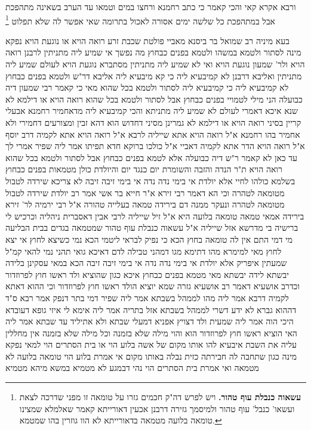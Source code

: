 \documentclass[12pt, openany]{book}
\newcommand{\footnotecomment}[1]{\footnote{#1}}
\newcommand{\commenta}[1]{\footnotecomment{#1}}
\begin{document}
{ורבא אקרא קאי והכי קאמר  כי כתב רחמנא ורחצו במים וטמאו עד הערב בשאינה מתהפכת אבל במתהפכת כל שלשה ימים אסורה לאכול בתרומה שאי אפשר לה שלא תפלוט 
\commenta{\textbf{עשאוה כנבלת עוף טהור.}  ויש לפרש דה"ק חכמים גזרו על טומאה זו מפני שדרכה לצאת ועשאו' כנבל' עוף טהור ולמיסמך גזירה דרבנן אכעין דאורייתא קאמר שאלמלא שמצינו טומאה בלועה מטמאה בדאורייתא לא הוו גוזרין בהו שמטמא. }

בעא מיניה רב שמואל בר ביסנא מאביי  פולטת שכבת זרע רואה הויא או נוגעת הויא 
נפקא מינה  לסתור ולטמא במשהו ולטמא בפנים כבחוץ 
מה נפשך אי שמיע ליה מתניתין לרבנן רואה הויא ולר' שמעון נוגעת הויא 
ואי לא שמיע ליה מתניתין מסתברא נוגעת הויא 
לעולם שמיע ליה מתניתין ואליבא דרבנן לא קמיבעיא ליה כי קא מיבעיא ליה אליבא דר"ש 
ולטמא בפנים כבחוץ לא קמיבעיא ליה כי קמיבעיא ליה לסתור ולטמא בכל שהוא מאי 
כי קאמר רבי שמעון דיה כבועלה הני מילי לטמויי בפנים כבחוץ אבל לסתור ולטמא בכל שהוא רואה הויא או דילמא לא שנא 
איכא דאמרי  לעולם לא שמיע ליה מתניתא והכי קמיבעיא ליה מדאחמיר רחמנא אבעלי קריין בסיני רואה הויא 
או דילמא  לא גמרינן מסיני דחדוש הוא דהא זבין ומצורעים דחמירי ולא אחמיר בהו רחמנא 
א"ל  רואה הויא  אתא שייליה לרבא א"ל  רואה הויא  אתא לקמיה דרב יוסף א"ל  רואה הויא  הדר אתא לקמיה דאביי א"ל  כולכו ברוקא חדא תפיתו 
אמר ליה  שפיר אמרי לך עד כאן לא קאמר ר"ש דיה כבועלה אלא לטמא בפנים כבחוץ אבל לסתור ולטמא בכל שהוא רואה הויא
ת"ר  הנדה והזבה והשומרת יום כנגד יום והיולדת כולן מטמאות בפנים כבחוץ 
בשלמא כולהו לחיי אלא יולדת אי בימי נדה נדה אי בימי זיבה זיבה 
לא צריכא שירדה לטבול מטומאה לטהרה 
וכי הא דאמר רבי זירא א"ר חייא בר אשי אמר רב  יולדת שירדה לטבול מטומאה לטהרה ונעקר ממנה דם בירידה טמאה בעלייה טהורה 
א"ל רבי ירמיה לר' זירא  בירידה אמאי טמאה  טומאה בלועה היא  א"ל  זיל שייליה לרבי אבין דאסברית ניהליה וכרכיש לי ברישיה בי מדרשא 
אזל שייליה א"ל  עשאוה כנבלת עוף טהור שמטמאה בגדים בבית הבליעה  מי דמי
התם אין לה טומאה בחוץ הכא כי נפיק לבראי ליטמי  הכא נמי כשיצא לחוץ 
אי יצא לחוץ מאי למימרא  מהו דתימא  מגו דמהני טבילה לדם דאיכא גואי תהני נמי להאי קמ"ל 
שמעתין איפריק אלא יולדת אי בימי נדה נדה אי בימי זיבה זיבה 
הכא במאי עסקינן בלידה יבשתא  לידה יבשתא מאי מטמא בפנים כבחוץ איכא 
כגון שהוציא ולד ראשו חוץ לפרוזדור וכדרב אושעיא  דאמר רב אושעיא  גזרה שמא יוציא הולד ראשו חוץ לפרוזדור 
וכי ההוא דאתא לקמיה דרבא אמר ליה  מהו לממהל בשבתא  אמר ליה  שפיר דמי  בתר דנפק אמר רבא  ס"ד דההוא גברא לא ידע דשרי לממהל בשבתא  אזל בתריה אמר ליה  אימא לי איזי גופא דעובדא היכי הוה 
אמר ליה  שמעית ולד דצויץ אפניא דמעלי שבתא ולא אתיליד עד שבתא  אמר ליה  האי הוציא ראשו חוץ לפרוזדור הוא והוי מילה שלא בזמנה וכל מילה שלא בזמנה אין מחללין עליה את השבת 
איבעיא להו  אותו מקום של אשה בלוע הוי או בית הסתרים הוי 
למאי נפקא מינה כגון שתחבה לה חבירתה כזית נבלה באותו מקום  אי אמרת בלוע הוי טומאה בלועה לא מטמאה ואי אמרת בית הסתרים הוי נהי דבמגע לא מטמיא במשא מיהא מטמיא 
}
\end{document}
